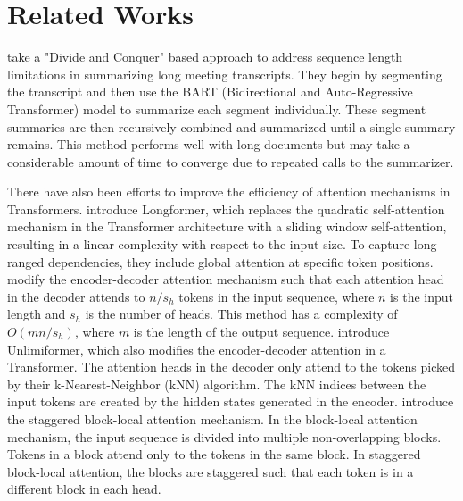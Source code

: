 \section{Related Works}
	\label{sec:related-works}

	\citet{golia2024action} take a "Divide and Conquer" based approach to address
	sequence length limitations in summarizing long meeting transcripts.
	They begin by segmenting the transcript and then use the BART (Bidirectional and
	Auto-Regressive Transformer) model to summarize each segment individually.
	These segment summaries are then recursively combined and summarized until a single
	summary remains.
	This method performs well with long documents but may take a considerable amount of time
	to converge due to repeated calls to the summarizer.

	There have also been efforts to improve the efficiency of attention mechanisms in Transformers.
	\citet{beltagy2020longformer} introduce Longformer, which replaces the quadratic
	self-attention mechanism in the Transformer architecture with a sliding window self-attention,
	resulting in a linear complexity with respect to the input size.
	To capture long-ranged dependencies, they include global attention at specific token positions.
	\citet{huang-etal-2021-efficient} modify the encoder-decoder attention mechanism such that
	each attention head in the decoder attends to $n/s_h$ tokens in the input sequence, where
	$n$ is the input length and $s_h$ is the number of heads.
	This method has a complexity of $O(mn/s_h)$, where $m$ is the length of the output sequence.
	\citet{bertsch2023unlimiformer} introduce Unlimiformer, which also modifies the encoder-decoder
	attention in a Transformer.
	The attention heads in the decoder only attend to the tokens picked by their
	k-Nearest-Neighbor (kNN) algorithm.
	The kNN indices between the input tokens are created by the hidden states generated in the
	encoder.
	\citet{phang2022investigating} introduce the staggered block-local attention mechanism.
	In the block-local attention mechanism, the input sequence is divided into multiple
	non-overlapping blocks.
	Tokens in a block attend only to the tokens in the same block.
	In staggered block-local attention, the blocks are staggered such that each token is in a
	different block in each head.

